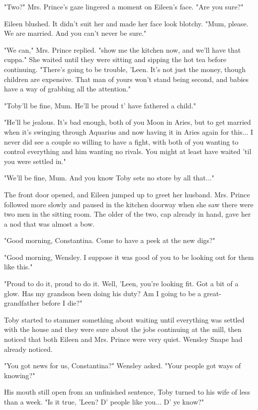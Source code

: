 \documentclass[a4paper,11pt]{article}
\begin{document}
"Two?" Mrs. Prince's gaze lingered a moment on Eileen's face. "Are you sure?"

Eileen blushed. It didn't suit her and made her face look blotchy. "Mum, please. We are married. And you can't never be sure."

"We can," Mrs. Prince replied. "show me the kitchen now, and we'll have that cuppa." She waited until they were sitting and sipping the hot tea before continuing. "There's going to be trouble, 'Leen. It's not just the money, though children are expensive. That man of yours won't stand being second, and babies have a way of grabbing all the attention."

"Toby'll be fine, Mum. He'll be proud t' have fathered a child."

"He'll be jealous. It's bad enough, both of you Moon in Aries, but to get married when it's swinging through Aquarius and now having it in Aries again for this... I never did see a couple so willing to have a fight, with both of you wanting to control everything and him wanting no rivals. You might at least have waited 'til you were settled in."

"We'll be fine, Mum. And you know Toby sets no store by all that..."

The front door opened, and Eileen jumped up to greet her husband. Mrs. Prince followed more slowly and paused in the kitchen doorway when she saw there were two men in the sitting room. The older of the two, cap already in hand, gave her a nod that was almost a bow.

"Good morning, Constantina. Come to have a peek at the new digs?"

"Good morning, Wensley. I suppose it was good of you to be looking out for them like this."

"Proud to do it, proud to do it. Well, 'Leen, you're looking fit. Got a bit of a glow. Has my grandson been doing his duty? Am I going to be a great-grandfather before I die?"

Toby started to stammer something about waiting until everything was settled with the house and they were sure about the jobs continuing at the mill, then noticed that both Eileen and Mrs. Prince were very quiet. Wensley Snape had already noticed.

"You got news for us, Constantina?" Wensley asked. "Your people got ways of knowing?"

His mouth still open from an unfinished sentence, Toby turned to his wife of less than a week. "Is it true, 'Leen? D' people like you... D' ye know?"
\end{document}
